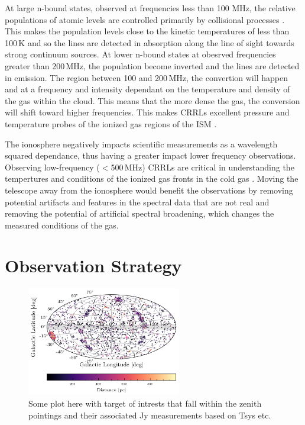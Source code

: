 At large n-bound states, observed at frequencies less than 100 MHz, the relative populations of atomic levels are controlled primarily by collisional processes \citep{Tremblay_2018}. This makes the
population levels close to the kinetic temperatures of less than 100\,K and so the lines are detected in absorption along the line of sight towards strong continuum sources. At lower n-bound states at obesrved frequencies greater than 200\,MHz, the population become inverted and the lines are detected in emission. The region between 100 and 200\,MHz, the convertion will happen and at a frequency and intensity dependant on the temperature and density of the gas within the cloud. This means that the more dense the gas, the conversion will shift toward higher frequencies. This makes CRRLs excellent pressure and temperature probes of the ionized gas regions of the ISM \citep{Salas_2019}.

The ionosphere negatively impacts scientific measurements as a wavelength squared dependance, thus having a greater impact lower frequency observations. Observing low-frequency ($<$500\,MHz) CRRLs are critical in understanding the tempertures and conditions of the ionized gas fronts in the cold gas \citep{Salas_2018}. Moving the telescope away from the ionosphere would benefit the observations by removing potential artifacts and features in the spectral data that are not real and removing the potential of artificial spectral broadening, which changes the measured conditions of the gas.


\section{Observation Strategy} %

\begin{figure}[h]
    \centering
    \includegraphics[width=0.6\textwidth]{figures/Science Case Plots/galactic_projection_NEA.png}
    \caption{Some plot here with target of intrests that fall within the zenith pointings and their associated Jy measurements based on Tsys etc. }
    \label{fig:enter-label}
\end{figure}

